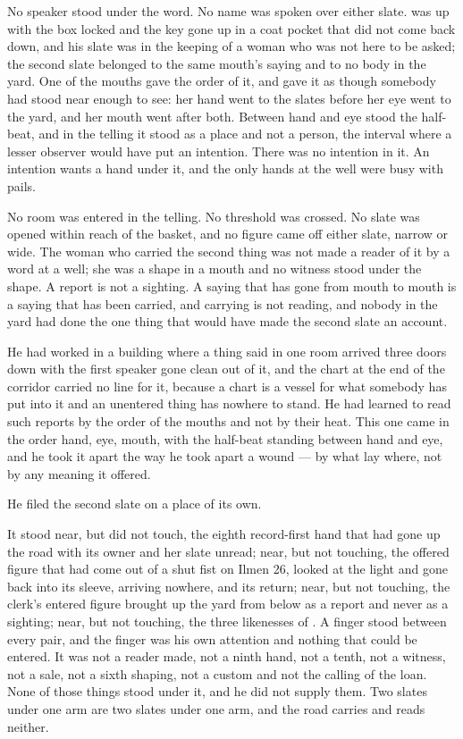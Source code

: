 No speaker stood under the word. No name was spoken over either slate.  was up  with the box locked and the key gone up in a coat pocket that did not come back down, and his slate was in the keeping of a woman who was not here to be asked; the second slate belonged to the same mouth's saying and to no body in the yard. One of the mouths gave the order of it, and gave it as though somebody had stood near enough to see: her hand went to the slates before her eye went to the yard, and her mouth went after both. Between hand and eye stood the half-beat, and in the telling it stood as a place and not a person, the interval where a lesser observer would have put an intention. There was no intention in it. An intention wants a hand under it, and the only hands at the well were busy with pails.

No room was entered in the telling. No threshold was crossed. No slate was opened within reach of the basket, and no figure came off either slate, narrow or wide. The woman who carried the second thing was not made a reader of it by a word at a well; she was a shape in a mouth and no witness stood under the shape. A report is not a sighting. A saying that has gone from mouth to mouth is a saying that has been carried, and carrying is not reading, and nobody in the yard had done the one thing that would have made the second slate an account.

He had worked in a building where a thing said in one room arrived three doors down with the first speaker gone clean out of it, and the chart at the end of the corridor carried no line for it, because a chart is a vessel for what somebody has put into it and an unentered thing has nowhere to stand. He had learned to read such reports by the order of the mouths and not by their heat. This one came in the order hand, eye, mouth, with the half-beat standing between hand and eye, and he took it apart the way he took apart a wound --- by what lay where, not by any meaning it offered.

\scenebreak

He filed the second slate on a place of its own.

It stood near, but did not touch, the eighth record-first hand that had gone up the road with its owner and her slate unread; near, but not touching, the offered figure that had come out of a shut fist on Ilmen 26, looked at the light and gone back into its sleeve, arriving nowhere, and its return; near, but not touching, the clerk's entered figure brought up the yard from  below  as a report and never as a sighting; near, but not touching, the three likenesses of . A finger stood between every pair, and the finger was his own attention and nothing that could be entered. It was not a reader made, not a ninth hand, not a tenth, not a witness, not a sale, not a sixth shaping, not a custom and not the calling of the loan. None of those things stood under it, and he did not supply them. Two slates under one arm are two slates under one arm, and the road carries and reads neither.

